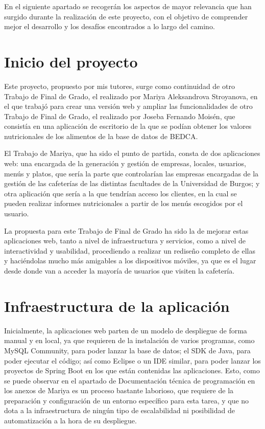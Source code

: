 
En el siguiente apartado se recogerán los aspectos de mayor relevancia que han surgido durante la realización de este proyecto, con el objetivo de comprender mejor el desarrollo y los desafíos encontrados a lo largo del camino.

\section{Inicio del proyecto}

Este proyecto, propuesto por mis tutores, surge como continuidad de otro Trabajo de Final de Grado, el realizado por Mariya Aleksandrova Stroyanova, en el que trabajó para crear una versión web y ampliar las funcionalidades de otro Trabajo de Final de Grado, el realizado por Joseba Fernando Moisén, que consistía en una aplicación de escritorio de la que se podían obtener los valores nutricionales de los alimentos de la base de datos de BEDCA. 

El Trabajo de Mariya, que ha sido el punto de partida, consta de dos aplicaciones web: una encargada de la generación y gestión de empresas, locales, usuarios, menús y platos, que sería la parte que controlarían las empresas encargadas de la gestión de las cafeterías de las distintas facultades de la Universidad de Burgos; y otra aplicación que sería a la que tendrían acceso los clientes, en la cual se pueden realizar informes nutricionales a partir de los menús escogidos por el usuario.

La propuesta para este Trabajo de Final de Grado ha sido la de mejorar estas aplicaciones web, tanto a nivel de infraestructura y servicios, como a nivel de interactividad y usabilidad, procediendo a realizar un rediseño completo de ellas y haciéndolas mucho más amigables a los dispositivos móviles, ya que es el lugar desde donde van a acceder la mayoría de usuarios que visiten la cafetería.

\section{Infraestructura de la aplicación}

Inicialmente, la aplicaciones web parten de un modelo de despliegue de forma manual y en local, ya que requieren de la instalación de varios programas, como MySQL Community, para poder lanzar la base de datos; el SDK de Java, para poder ejecutar el código; así como Eclipse o un IDE similar, para poder lanzar los proyectos de Spring Boot en los que están contenidas las aplicaciones. Esto, como se puede observar en el apartado de Documentación técnica de programación en los anexos de Mariya \cite{tfg-mariya:anexos} es un proceso bastante laborioso, que requiere de la preparación y configuración de un entorno específico para esta tarea, y que no dota a la infraestructura de ningún tipo de escalabilidad ni posibilidad de automatización a la hora de su despliegue.

